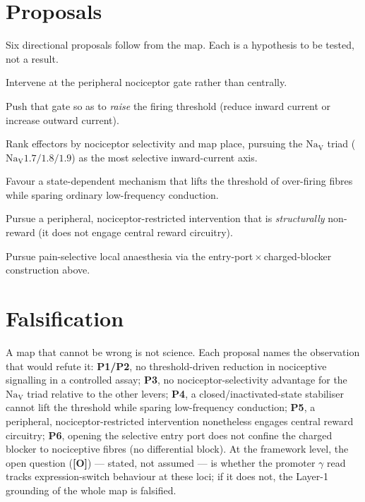 \documentclass[11pt]{article}
\newcommand{\gO}{\textcolor{go}{\textbf{[O]}}}
\begin{document}
\section{Proposals}
Six directional proposals follow from the map. Each is a hypothesis to be tested, not a result.
\begin{description}[leftmargin=2.2em,style=nextline]
\item[P1 --- Gate.] Intervene at the peripheral nociceptor gate rather than centrally.
\item[P2 --- Direction.] Push that gate so as to \emph{raise} the firing threshold (reduce inward current or increase outward current).
\item[P3 --- Axis.] Rank effectors by nociceptor selectivity and map place, pursuing the $\mathrm{Na_V}$ triad ($\mathrm{Na_V}1.7/1.8/1.9$) as the most selective inward-current axis.
\item[P4 --- Shape.] Favour a state-dependent mechanism that lifts the threshold of over-firing fibres while sparing ordinary low-frequency conduction.
\item[P5 --- Opioid alternative.] Pursue a peripheral, nociceptor-restricted intervention that is \emph{structurally} non-reward (it does not engage central reward circuitry).
\item[P6 --- Differential block.] Pursue pain-selective local anaesthesia via the entry-port\,$\times$\,charged-blocker construction above.
\end{description}

\section{Falsification}
A map that cannot be wrong is not science. Each proposal names the observation that would refute it: \textbf{P1/P2}, no threshold-driven reduction in nociceptive signalling in a controlled assay; \textbf{P3}, no nociceptor-selectivity advantage for the $\mathrm{Na_V}$ triad relative to the other levers; \textbf{P4}, a closed/inactivated-state stabiliser cannot lift the threshold while sparing low-frequency conduction; \textbf{P5}, a peripheral, nociceptor-restricted intervention nonetheless engages central reward circuitry; \textbf{P6}, opening the selective entry port does not confine the charged blocker to nociceptive fibres (no differential block). At the framework level, the open question (\gO{}) --- stated, not assumed --- is whether the promoter $\gamma$ read tracks expression-switch behaviour at these loci; if it does not, the Layer-1 grounding of the whole map is falsified.
\end{document}
